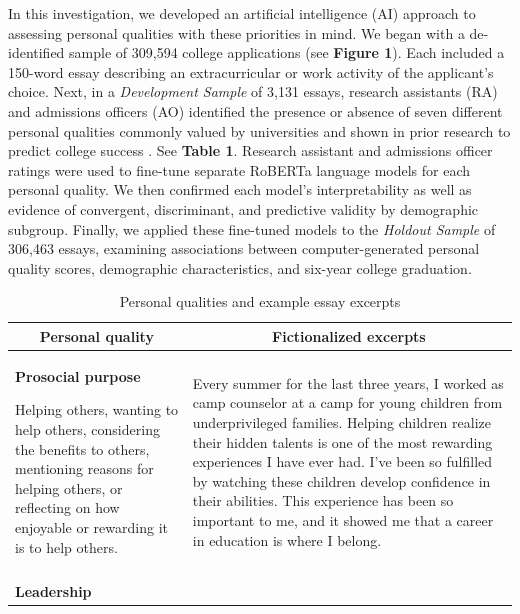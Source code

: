 \documentclass[11pt]{report}
\begin{document}
\begin{mainf}
In this investigation, we developed an artificial intelligence (AI) approach to assessing personal qualities with these priorities in mind. 
We began with a de-identified sample of 309,594 college applications (see \textbf{Figure 1}). Each included a 150-word essay describing an extracurricular or work activity of the applicant’s choice. Next, in a \textit{Development Sample} of 3,131 essays, research assistants (RA) and admissions officers (AO) identified the presence or absence of seven different personal qualities commonly valued by universities and shown in prior research to predict college success \cite{almlund_personality_2011}. See \textbf{Table 1}. Research assistant and admissions officer ratings were used to fine-tune separate RoBERTa language models \cite{liu_roberta_2019} for each personal quality. We then confirmed each model’s interpretability as well as evidence of convergent, discriminant, and predictive validity by demographic subgroup. Finally, we applied these fine-tuned models to the \textit{Holdout Sample} of 306,463 essays, examining associations between computer-generated personal quality scores, demographic characteristics, and six-year college graduation.

\begin{table}
\small
\caption{Personal qualities and example essay excerpts}
\def\arraystretch{1}%
\begin{tabular}{  p{.275\linewidth}  p{.675\linewidth}}
\hline
\multicolumn{1}{c}{\textbf{Personal quality}} & \multicolumn{1}{c}{\textbf{Fictionalized excerpts}}\\                                                                      \hline
\textbf{Prosocial purpose}

Helping others, wanting to help others, considering the benefits to others, mentioning reasons for helping others, or reflecting on how enjoyable or rewarding it is to help others. & Every summer for the last three years, I worked as camp counselor at a camp for young children from underprivileged families. Helping children realize their hidden talents is one of the most rewarding experiences I have ever had. I’ve been so fulfilled by watching these children develop confidence in their abilities. This experience has been so important to me, and it showed me that a career in education is where I belong.                                         \\ \\
\textbf{Leadership}


\end{tabular}
\end{table}
\end{mainf}
\end{document}
